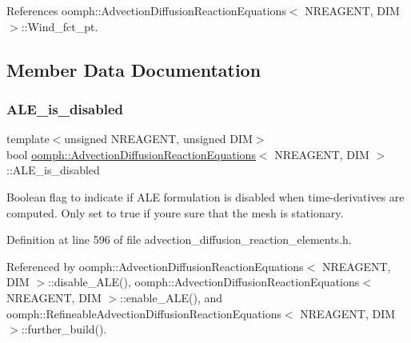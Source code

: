 References oomph\+::\+Advection\+Diffusion\+Reaction\+Equations$<$ N\+R\+E\+A\+G\+E\+N\+T, D\+I\+M $>$\+::\+Wind\+\_\+fct\+\_\+pt.



\subsection{Member Data Documentation}
\mbox{\label{classoomph_1_1AdvectionDiffusionReactionEquations_a1b28c2757c2b2c64030230c3a7a2fb91}} 
\subsubsection{\texorpdfstring{A\+L\+E\+\_\+is\+\_\+disabled}{ALE\_is\_disabled}}
{\footnotesize\ttfamily template$<$unsigned N\+R\+E\+A\+G\+E\+NT, unsigned D\+IM$>$ \\
bool \hyperlink{classoomph_1_1AdvectionDiffusionReactionEquations}{oomph\+::\+Advection\+Diffusion\+Reaction\+Equations}$<$ N\+R\+E\+A\+G\+E\+NT, D\+IM $>$\+::A\+L\+E\+\_\+is\+\_\+disabled\hspace{0.3cm}{\ttfamily [protected]}}



Boolean flag to indicate if A\+LE formulation is disabled when time-\/derivatives are computed. Only set to true if you\textquotesingle{}re sure that the mesh is stationary. 



Definition at line 596 of file advection\+\_\+diffusion\+\_\+reaction\+\_\+elements.\+h.



Referenced by oomph\+::\+Advection\+Diffusion\+Reaction\+Equations$<$ N\+R\+E\+A\+G\+E\+N\+T, D\+I\+M $>$\+::disable\+\_\+\+A\+L\+E(), oomph\+::\+Advection\+Diffusion\+Reaction\+Equations$<$ N\+R\+E\+A\+G\+E\+N\+T, D\+I\+M $>$\+::enable\+\_\+\+A\+L\+E(), and oomph\+::\+Refineable\+Advection\+Diffusion\+Reaction\+Equations$<$ N\+R\+E\+A\+G\+E\+N\+T, D\+I\+M $>$\+::further\+\_\+build().

\mbox{\label{classoomph_1_1AdvectionDiffusionReactionEquations_abac46550a5b363e6b08a7505e689ae18}} 
